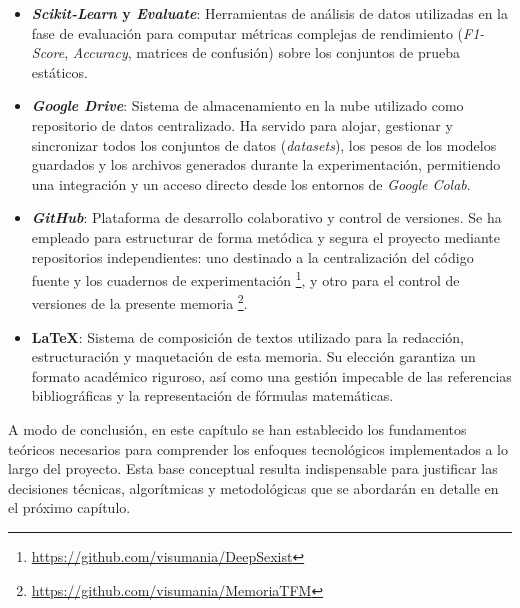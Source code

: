 \begin{itemize}
    \item \textbf{\textit{Scikit-Learn} y \textit{Evaluate}}: Herramientas de análisis de datos utilizadas en la fase de evaluación para computar métricas complejas de rendimiento (\textit{F1-Score}, \textit{Accuracy}, matrices de confusión) sobre los conjuntos de prueba estáticos.
    \item \textbf{\textit{Google Drive}}: Sistema de almacenamiento en la nube utilizado como repositorio de datos centralizado. Ha servido para alojar, gestionar y sincronizar todos los conjuntos de datos (\textit{datasets}), los pesos de los modelos guardados y los archivos generados durante la experimentación, permitiendo una integración y un acceso directo desde los entornos de \textit{Google Colab}.
    \item \textbf{\textit{GitHub}}: Plataforma de desarrollo colaborativo y control de versiones. Se ha empleado para estructurar de forma metódica y segura el proyecto mediante repositorios independientes: uno destinado a la centralización del código fuente y los cuadernos de experimentación \footnote{\url{https://github.com/visumania/DeepSexist}}, y otro para el control de versiones de la presente memoria \footnote{\url{https://github.com/visumania/MemoriaTFM}}. 
    \item \textbf{\LaTeX{}}: Sistema de composición de textos utilizado para la redacción, estructuración y maquetación de esta memoria. Su elección garantiza un formato académico riguroso, así como una gestión impecable de las referencias bibliográficas y la representación de fórmulas matemáticas. 
\end{itemize}

A modo de conclusión, en este capítulo se han establecido los fundamentos teóricos necesarios para comprender los enfoques tecnológicos implementados a lo largo del proyecto. Esta base conceptual resulta indispensable para justificar las decisiones técnicas, algorítmicas y metodológicas que se abordarán en detalle en el próximo capítulo. 